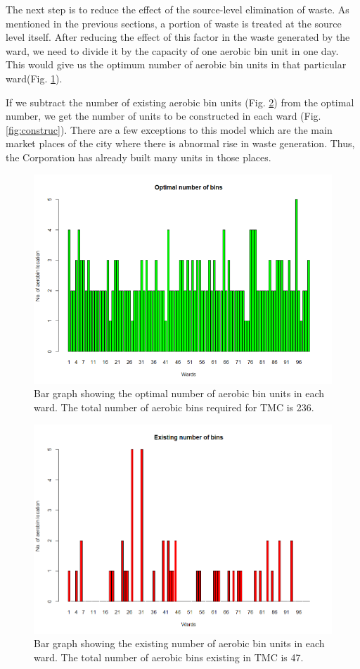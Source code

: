 \documentclass[12pt,a4paper]{report}
\begin{document}
The next step is to reduce the effect of the source-level elimination of waste. As mentioned in the previous sections, a portion of waste is treated at the source level itself. After reducing the effect of this factor in the waste generated by the ward, we need to divide it by the capacity of one aerobic bin unit in one day. This would give us the optimum number of aerobic bin units in that particular ward(Fig. \ref{fig:optimal}). 

If we subtract the number of existing aerobic bin units (Fig. \ref{fig:exis}) from the optimal number, we get the number of units to be constructed in each ward (Fig. \ref{fig:construc}). There are a few exceptions to this model which are the main market places of the city where there is abnormal rise in waste generation. Thus, the Corporation has already built many units in those places.

\begin{figure}[H]
	\centering
	\includegraphics[width=0.7\linewidth]{optimal}
	\caption{Bar graph showing the optimal number of aerobic bin units in each ward. The total number of aerobic bins required for TMC is 236.}
	\label{fig:optimal}
\end{figure}
	
\begin{figure}[H]
	\centering
	\includegraphics[width=0.7\linewidth]{exis}
	\caption{Bar graph showing the existing number of aerobic bin units in each ward. The total number of aerobic bins existing in TMC is 47.}
	\label{fig:exis}
\end{figure}
\end{document}
